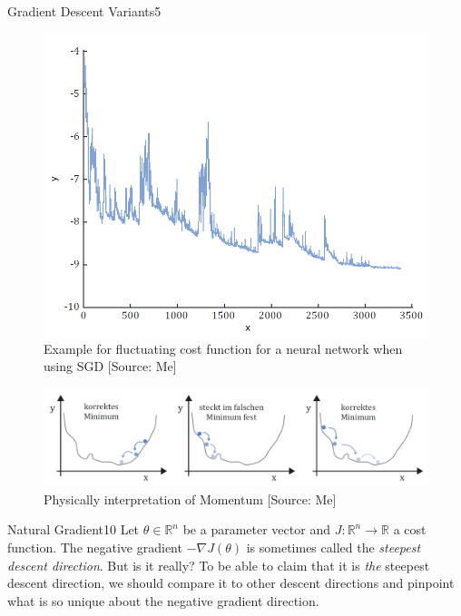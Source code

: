 \begin{questions}
\begin{question}{Gradient Descent Variants}{5}
\begin{figure}[]
	\includegraphics[width=12cm, scale=0.5]{SGD.png}
	\caption{Example for fluctuating cost function for a neural network when using SGD [Source: Me]}
	\label{fig:SGD_cost_function}
\end{figure}
\begin{figure}[]
	\includegraphics[width=\linewidth, scale=0.5]{momentum.png}
	\caption{Physically interpretation of Momentum [Source: Me]}
	\label{fig:Momentum}
\end{figure}


\end{question}

\begin{question}[bonus]{Natural Gradient}{10}
Let $\theta \in \mathbb{R}^n$ be a parameter vector
and $J \colon \mathbb{R}^n \to \mathbb{R}$ a cost function.
The negative gradient $-\nabla J(\theta)$ is sometimes called
the \emph{steepest descent direction}. But is it really?
To be able to claim that it is \emph{the} steepest descent direction,
we should compare it to other descent directions
and pinpoint what is so unique about the negative gradient direction.


\end{question}
\end{questions}
